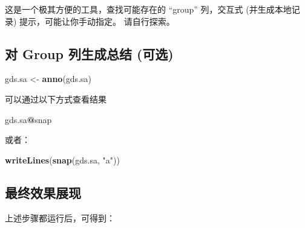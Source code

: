 \documentclass[
]{article}
\newenvironment{Shaded}{\begin{snugshade}}{\end{snugshade}}
\newcommand{\CommentTok}[1]{\textcolor[rgb]{0.56,0.35,0.01}{\textit{#1}}}
\newcommand{\KeywordTok}[1]{\textcolor[rgb]{0.13,0.29,0.53}{\textbf{#1}}}
\newcommand{\NormalTok}[1]{#1}
\newcommand{\OperatorTok}[1]{\textcolor[rgb]{0.81,0.36,0.00}{\textbf{#1}}}
\newcommand{\StringTok}[1]{\textcolor[rgb]{0.31,0.60,0.02}{#1}}
\begin{document}
这是一个极其方便的工具，查找可能存在的 ``group'' 列，交互式 (并生成本地记录) 提示，可能让你手动指定。
请自行探索。

\begin{Shaded}
\end{Shaded}

\hypertarget{ux5bf9-group-ux5217ux751fux6210ux603bux7ed3-ux53efux9009}{%
\subsection{对 Group 列生成总结 (可选)}\label{ux5bf9-group-ux5217ux751fux6210ux603bux7ed3-ux53efux9009}}

\begin{Shaded}
\begin{Highlighting}[]
\NormalTok{gds.sa \textless{}{-}}\StringTok{ }\KeywordTok{anno}\NormalTok{(gds.sa)}
\end{Highlighting}
\end{Shaded}

可以通过以下方式查看结果

\begin{Shaded}
\begin{Highlighting}[]
\NormalTok{gds.sa}\OperatorTok{@}\NormalTok{snap}
\end{Highlighting}
\end{Shaded}

或者：

\begin{Shaded}
\begin{Highlighting}[]
\KeywordTok{writeLines}\NormalTok{(}\KeywordTok{snap}\NormalTok{(gds.sa, }\StringTok{"a"}\NormalTok{))}
\end{Highlighting}
\end{Shaded}

\hypertarget{ux6700ux7ec8ux6548ux679cux5c55ux73b0}{%
\subsection{最终效果展现}\label{ux6700ux7ec8ux6548ux679cux5c55ux73b0}}

上述步骤都运行后，可得到：
\end{document}
